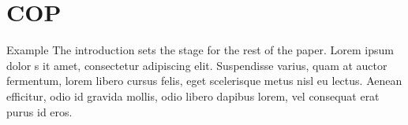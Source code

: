 \section{COP}
Example\cite{exampleCitation}
The introduction sets the stage for the rest of the paper. Lorem ipsum dolor s
it amet, consectetur adipiscing elit. Suspendisse varius, quam at auctor fermentum, 
lorem libero cursus felis, eget scelerisque metus nisl eu lectus. Aenean efficitur, 
odio id gravida mollis, odio libero dapibus lorem, vel consequat erat purus id eros. 